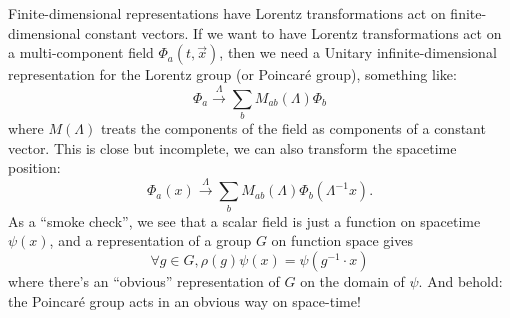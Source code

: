 Finite-dimensional representations have Lorentz transformations act on
finite-dimensional constant vectors. If we want to have Lorentz
transformations act on a multi-component field $\Phi_{a}(t,\vec{x})$,
then we need a Unitary infinite-dimensional representation for the
Lorentz group (or Poincar\'e group), something like:
\begin{equation}
\Phi_{a}\xrightarrow{\Lambda}\sum_{b}M_{ab}(\Lambda)\Phi_{b}
\end{equation}
where $M(\Lambda)$ treats the components of the field as components of a
constant vector. This is close but incomplete, we can also transform the
spacetime position:
\begin{equation}
\Phi_{a}(x)\xrightarrow{\Lambda}\sum_{b}M_{ab}(\Lambda)\Phi_{b}(\Lambda^{-1}x).
\end{equation}
As a ``smoke check'', we see that a scalar field is just a function on
spacetime $\psi(x)$, and a representation of a group $G$ on function space
gives
\begin{equation}
\forall g\in G, \rho(g)\psi(x)=\psi(g^{-1}\cdot x)
\end{equation}
where there's an ``obvious'' representation of $G$ on the domain of $\psi$.
And behold: the Poincar\'e group acts in an obvious way on space-time!


